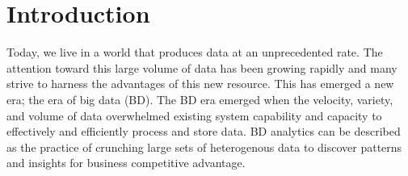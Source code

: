 \documentclass{bmcart}
\begin{document}
\begin{frontmatter}
\begin{abstractbox}

\begin{keyword}
\end{keyword}


\end{abstractbox}
%

\end{frontmatter}




\section{Introduction}


Today, we live in a world that produces data at an unprecedented rate. The attention toward this large volume of data has been growing rapidly and many strive to harness the advantages of this new resource. This has emerged a new era; the era of big data (BD). The BD era emerged when the velocity, variety, and volume of data overwhelmed existing system capability and capacity to effectively and efficiently process and store data. BD analytics can be described as the practice of crunching large sets of heterogenous data to discover patterns and insights for business competitive advantage.
\end{document}
